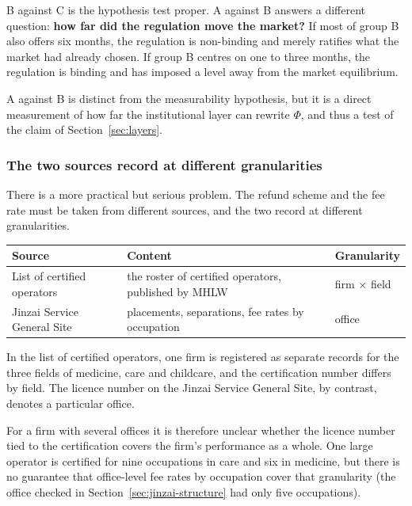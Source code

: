 B against C is the hypothesis test proper. A against B answers a different question:
\textbf{how far did the regulation move the market?} If most of group B also offers six months,
the regulation is non-binding and merely ratifies what the market had already chosen. If group B
centres on one to three months, the regulation is binding and has imposed a level away from the
market equilibrium.

A against B is distinct from the measurability hypothesis, but it is a direct measurement of how
far the institutional layer can rewrite $\Phi$, and thus a test of the claim of
Section~\ref{sec:layers}.

\subsubsection{The two sources record at different granularities}
\label{sec:unit-mismatch}

There is a more practical but serious problem. The refund scheme and the fee rate must be taken
from different sources, and the two record at different granularities.

\begin{center}
\begin{tabularx}{\textwidth}{@{}lXl@{}}
\toprule
Source & Content & Granularity \\
\midrule
List of certified operators & the roster of certified operators, published by MHLW & firm $\times$ field \\
Jinzai Service General Site & placements, separations, fee rates by occupation & office \\
\bottomrule
\end{tabularx}
\label{tab:record-granularity}
\end{center}

In the list of certified operators, one firm is registered as separate records for the three
fields of medicine, care and childcare, and the certification number differs by field. The
licence number on the Jinzai Service General Site, by contrast, denotes a particular office.

For a firm with several offices it is therefore unclear whether the licence number tied to the
certification covers the firm's performance as a whole. One large operator is certified for nine
occupations in care and six in medicine, but there is no guarantee that office-level fee rates by
occupation cover that granularity (the office checked in Section~\ref{sec:jinzai-structure} had
only five occupations).

